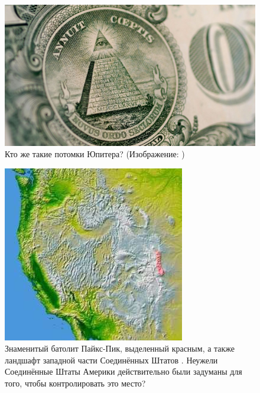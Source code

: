 \documentclass[10pt,twocolumn,letterpaper]{article}
\begin{document}
\begin{figure}[t]
\begin{center}
   \includegraphics[width=1\linewidth]{illuminati.jpg}
\end{center}
   \caption{Кто же такие потомки Юпитера? (Изображение: \cite{35})}
\label{fig:10}
\label{fig:onecol}
\end{figure}

\begin{figure}[t]
\begin{center}
   \includegraphics[width=1\linewidth]{pike.jpg}
\end{center}
   \caption{Знаменитый батолит Пайкс-Пик, выделенный красным, а также ландшафт западной части Соединённых Штатов \cite{36}. Неужели Соединённые Штаты Америки действительно были задуманы для того, чтобы контролировать это место?}
\label{fig:11}
\label{fig:onecol}
\end{figure}
\end{document}

